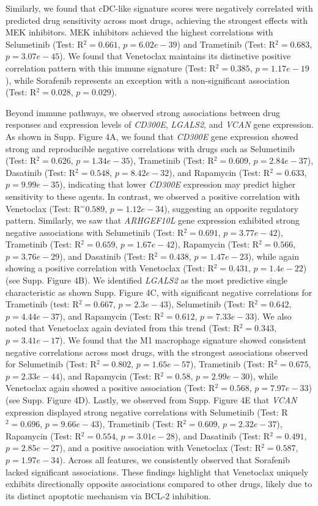 \documentclass[pdflatex,sn-mathphys-num]{sn-jnl}%
\theoremstyle{thmstyleone}%
\theoremstyle{thmstyletwo}%
\theoremstyle{thmstylethree}%
\begin{document}
Similarly, we found that cDC-like signature scores were negatively correlated with predicted drug sensitivity across most drugs, achieving the strongest effects with MEK inhibitors. 
MEK inhibitors achieved the highest correlations with Selumetinib (Test: R$^2=0.661$, $p=6.02e-39$) and Trametinib (Test: R$^2=0.683$, $p=3.07e-45$). 
We found that Venetoclax maintains its distinctive positive correlation pattern with this immune signature (Test: R$^2=0.385$, $p=1.17e-19$), while Sorafenib represents an exception with a non-significant association (Test: R$^2=0.028$, $p=0.029$). 

Beyond immune pathways, we observed strong associations between drug responses and expression levels of \textit{CD300E}, \textit{LGALS2}, and \textit{VCAN} gene expression. As shown in Supp. Figure 4A, we found that \textit{CD300E} gene expression showed strong and reproducible negative correlations with drugs such as Selumetinib (Test: R$^2 = 0.626$, $p = 1.34e-35$), Trametinib (Test: R$^2 = 0.609$, $p = 2.84e-37$), Dasatinib (Test: R$^2 = 0.548$, $p = 8.42e-32$), and Rapamycin (Test: R$^2 = 0.633$, $p = 9.99e-35$), indicating that lower \textit{CD300E} expression may predict higher sensitivity to these agents. In contrast, we observed a positive correlation with Venetoclax (Test: R$^ = 0.589$, $p = 1.12e-34$), suggesting an opposite regulatory pattern. Similarly, we saw that \textit{ARHGEF10L} gene expression exhibited strong negative associations with Selumetinib (Test: R$^2 = 0.691$, $p = 3.77e-42$), Trametinib (Test: R$^2 = 0.659$, $p = 1.67e-42$), Rapamycin (Test: R$^2 = 0.566$, $p = 3.76e-29$), and Dasatinib (Test: R$^2 = 0.438$, $p = 1.47e-23$), while again showing a positive correlation with Venetoclax (Test: R$^2 = 0.431$, $p = 1.4e-22$) (see Supp. Figure 4B). We identified \textit{LGALS2} as the most predictive single characteristic as shown Supp. Figure 4C, with significant negative correlations for Trametinib (test: R$^2 = 0.667$, $p = 2.3e-43$), Selumetinib (Test: R$^2 = 0.642$, $p = 4.44e-37$), and Rapamycin (Test: R$^2 = 0.612$, $p = 7.33e-33$). We also noted that Venetoclax again deviated from this trend (Test: R$^2 = 0.343$, $p = 3.41e-17$). We found that the M1 macrophage signature showed consistent negative correlations across most drugs, with the strongest associations observed for Selumetinib (Test: R$^2 = 0.802$, $p = 1.65e-57$), Trametinib (Test: R$^2 = 0.675$, $p = 2.33e-44$), and Rapamycin (Test: R$^2 = 0.58$, $p = 2.99e-30$), while Venetoclax again showed a positive association (Test: R$^2 = 0.568$, $p = 7.97e-33$) (see Supp. Figure 4D). Lastly, we observed from Supp. Figure 4E that \textit{VCAN} expression displayed strong negative correlations with Selumetinib (Test: R$^2 = 0.696$, $p = 9.66e-43$), Trametinib (Test: R$^2 = 0.609$, $p = 2.32e-37$), Rapamycin (Test: R$^2 = 0.554$, $p = 3.01e-28$), and Dasatinib (Test: R$^2 = 0.491$, $p = 2.85e-27$), and a positive association with Venetoclax (Test: R$^2 = 0.587$, $p = 1.97e-34$). Across all features, we consistently observed that Sorafenib lacked significant associations. These findings highlight that Venetoclax uniquely exhibits directionally opposite associations compared to other drugs, likely due to its distinct apoptotic mechanism via BCL-2 inhibition.
\end{document}
